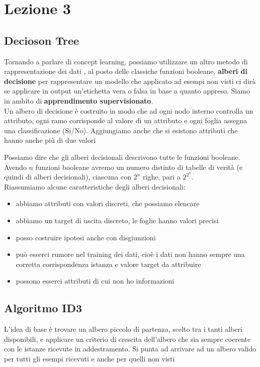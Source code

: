 \section{Lezione 3}
\subsection{Decioson Tree}
Tornando a parlare di concept learning, possiamo utilizzare un altro metodo di rappresentazione dei dati , al posto delle classiche funzioni booleane, \textbf{alberi di decisione} per rappresentare un modello che applicato ad esempi non visti ci dirà se applicare in output un'etichetta vera o falsa in base a quanto appreso. Siamo in ambito di \textbf{apprendimento supervisionato}.\\ 
Un albero di decisione è costruito in modo che ad ogni nodo interno controlla un attributo, ogni ramo corrisponde al valore di un attributo e ogni foglia assegna una classificazione (Si/No). Aggiungiamo anche che si esistono attributi che hanno anche più di due valori\textbf{}

Possiamo dire che gli alberi decisionali descrivono tutte le funzioni booleane. Avendo $n$ funzioni booleane avremo un numero distinto di tabelle di verità (e quindi di alberi decisionali), ciascuna con $2^n$ righe, pari a $2^{2^{n}}$.\\
Riassumiamo alcune caratteristiche degli alberi decisionali:
\begin{itemize}
  \item abbiamo attributi con valori discreti, che possiamo elencare
  \item abbiamo un target di uscita discreto, le foglie hanno valori precisi
  \item posso costruire ipotesi anche con disgiunzioni 
  \item può esserci rumore nel training dei dati, cioè i dati non hanno sempre una corretta corrispondenza istanza e valore target da attribuire
  \item possono esserci attributi di cui non ho informazioni
\end{itemize}
\subsection{Algoritmo ID3}
L'idea di base è trovare un albero piccolo di partenza, scelto tra i tanti alberi disponibili, e applicare un criterio di crescita dell'albero che sia sempre coerente con le istanze ricevute in addestramento. Si punta ad arrivare ad un albero valido per tutti gli esempi ricevuti e anche per quelli non visti

